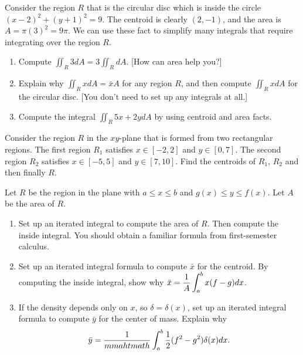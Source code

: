 \begin{problem}\label{centroid trick}
Consider the region $R$ that is the circular disc which is inside the circle $(x-2)^2+(y+1)^2=9$. The centroid is clearly $(2,-1)$, and the area is $A=\pi(3)^2=9\pi$.  We can use these fact to simplify many integrals that require integrating over the region $R$.  
\begin{enumerate}
 \item Compute $\iint_R 3dA = 3\iint_RdA$.  [How can area help you?]
 \item Explain why $\iint_R x dA = \bar x A$ for any region $R$, and then compute $\iint_R x dA$ for the circular disc. [You don't need to set up any integrals at all.]
 \item Compute the integral $\iint_R 5x+2y dA$ by using centroid and area facts.
\end{enumerate}
\end{problem}



\begin{problem}
Consider the region $R$ in the $xy$-plane that is formed from two rectangular regions.  The first region $R_1$ satisfies $x\in[-2,2]$ and $y\in[0,7]$.  The second region $R_2$ satisfies $x\in[-5,5]$ and $y\in[7,10]$.  Find the centroids of $R_1$, $R_2$ and then finally $R$.
\end{problem}


\begin{problem}
Let $R$ be the region in the plane with $a\leq x\leq b$ and $g(x)\leq y\leq f(x)$.  Let $A$ be the area of $R$.
\begin{enumerate}
 \item Set up an iterated integral to compute the area of $R$.  Then compute the inside integral. You should obtain a familiar formula from first-semester calculus.
 \item 
Set up an iterated integral formula to compute $\bar x$ for the centroid. By computing the inside integral, show why $\displaystyle\bar x = \frac{1}{A}\int_a^b x (f-g)dx$.
 \item If the density depends only on $x$, so $\delta = \delta (x)$, set up an iterated integral formula to compute $\bar y$ for the center of mass. Explain why $$\displaystyle\bar y = \frac{1}{mmahtmath}\int_a^b  \frac{1}{2}(f^2-g^2)\delta(x)dx.$$
\end{enumerate}
\end{problem}





